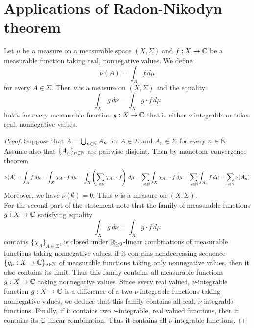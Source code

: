 \section{Applications of Radon-Nikodyn theorem}

\begin{proposition}\label{proposition:derivativeandintegration}
Let $\mu$ be a measure on a measurable space $(X,\Sigma)$ and $f:X\rightarrow {\mathbb C}$ be a measurable function taking real, nonnegative values. We define
$$\nu(A) = \int_Af\,d\mu$$
for every $A\in \Sigma$. Then $\nu$ is a measure on $(X,\Sigma)$ and the equality
$$\int_X g\,d\nu =\int_Xg\cdot f\,d\mu$$
holds for every measurable function $g:X\rightarrow {\mathbb C}$ that is either $\nu$-integrable or takes real, nonnegative values.
\end{proposition}
\begin{proof}
Suppose that $A = \bigcup_{n\in {\mathbb N}}A_n$ for $A\in \Sigma$ and $A_n\in \Sigma$ for every $n\in {\mathbb N}$. Assume also that $\{A_n\}_{n\in {\mathbb N}}$ are pairwise disjoint. Then by monotone convergence theorem
$$\nu(A) = \int_A f\,d\mu = \int_X\chi_A\cdot f\,d\mu = \int_X\left(\sum_{n\in {\mathbb N}}\chi_{A_n}\cdot f\right)\,d\mu = \sum_{n\in {\mathbb N}}\int_X\chi_{A_n}\cdot f\,d\mu = \sum_{n\in {\mathbb N}}\int_{A_n}f\,d\mu = \sum_{n\in {\mathbb N}}\nu(A_n)$$
Moreover, we have $\nu(\emptyset) = 0$. Thus $\nu$ is a measure on $(X,\Sigma)$.\\
For the second part of the statement note that the family of measurable functions $g:X\rightarrow {\mathbb C}$ satisfying equality
$$\int_Xg\,d\nu = \int_Xg\cdot f\,d\mu$$
contains $\{\chi_A\}_{A\in \Sigma}$, is closed under ${\mathbb R}_{\geq 0}$-linear combinations of measurable functions taking nonnegative values, if it contains nondecreasing sequence $\{g_n:X\rightarrow {\mathbb C}\}_{n\in {\mathbb N}}$ of measurable functions taking only nonnegative values, then it also contains its limit. Thus this family contains all measurable functions $g:X\rightarrow {\mathbb C}$ taking nonnegative values. Since every real valued, $\nu$-integrable function $g:X\rightarrow {\mathbb C}$ is a difference of a two $\nu$-integrable functions taking nonnegative values, we deduce that this family contains all real, $\nu$-integrable functions. Finally, if it contains two $\nu$-integrable, real valued functions, then it contains its ${\mathbb C}$-linear combination. Thus it contains all $\nu$-integrable functions.
\end{proof}

